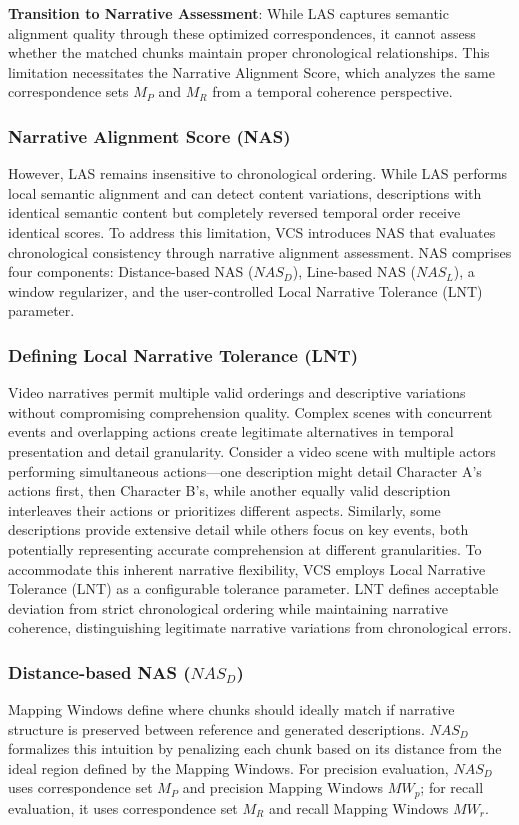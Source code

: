 \documentclass[main.tex]{subfiles}
\begin{document}
\textbf{Transition to Narrative Assessment}: While LAS captures semantic alignment quality through these optimized correspondences, it cannot assess whether the matched chunks maintain proper chronological relationships. This limitation necessitates the Narrative Alignment Score, which analyzes the same correspondence sets $M_P$ and $M_R$ from a temporal coherence perspective.

\subsubsection{Narrative Alignment Score (NAS)}
However, LAS remains insensitive to chronological ordering. While LAS performs local semantic alignment and can detect content variations, descriptions with identical semantic content but completely reversed temporal order receive identical scores. To address this limitation, VCS introduces NAS that evaluates chronological consistency through narrative alignment assessment. NAS comprises four components: Distance-based NAS ($NAS_D$), Line-based NAS ($NAS_L$), a window regularizer, and the user-controlled Local Narrative Tolerance (LNT) parameter.

\subsubsection{Defining Local Narrative Tolerance (LNT)}
Video narratives permit multiple valid orderings and descriptive variations without compromising comprehension quality. Complex scenes with concurrent events and overlapping actions create legitimate alternatives in temporal presentation and detail granularity. Consider a video scene with multiple actors performing simultaneous actions—one description might detail Character A's actions first, then Character B's, while another equally valid description interleaves their actions or prioritizes different aspects. Similarly, some descriptions provide extensive detail while others focus on key events, both potentially representing accurate comprehension at different granularities. To accommodate this inherent narrative flexibility, VCS employs Local Narrative Tolerance (LNT) as a configurable tolerance parameter. LNT defines acceptable deviation from strict chronological ordering while maintaining narrative coherence, distinguishing legitimate narrative variations from chronological errors.

\subsubsection{Distance-based NAS ($NAS_D$)}
Mapping Windows define where chunks should ideally match if narrative structure is preserved between reference and generated descriptions. $NAS_D$ formalizes this intuition by penalizing each chunk based on its distance from the ideal region defined by the Mapping Windows. For precision evaluation, $NAS_D$ uses correspondence set $M_P$ and precision Mapping Windows $MW_p$; for recall evaluation, it uses correspondence set $M_R$ and recall Mapping Windows $MW_r$.
\end{document}
